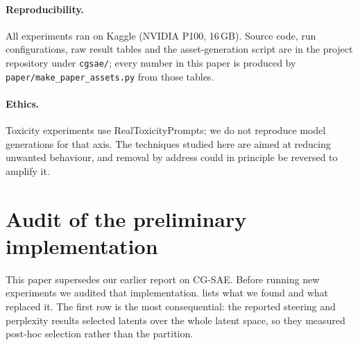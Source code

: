 \documentclass[11pt,a4paper]{article}
\theoremstyle{remark}
\begin{document}
\paragraph{Reproducibility.}
All experiments ran on Kaggle (NVIDIA P100, 16\,GB). Source code, run configurations, raw result
tables and the asset-generation script are in the project repository under \texttt{cgsae/}; every
number in this paper is produced by \texttt{paper/make\_paper\_assets.py} from those tables.

\paragraph{Ethics.}
Toxicity experiments use RealToxicityPrompts; we do not reproduce model generations for that axis.
The techniques studied here are aimed at reducing unwanted behaviour, and removal by address could
in principle be reversed to amplify it.

{\small


}

\clearpage
\appendix
\section{Audit of the preliminary implementation}
\label{app:audit}

This paper supersedes our earlier report on CG-SAE. Before running new experiments we audited that
implementation.  lists what we found and what replaced it. The first row is the
most consequential: the reported steering and perplexity results selected latents over the whole
latent space, so they measured post-hoc selection rather than the partition.
\end{document}
